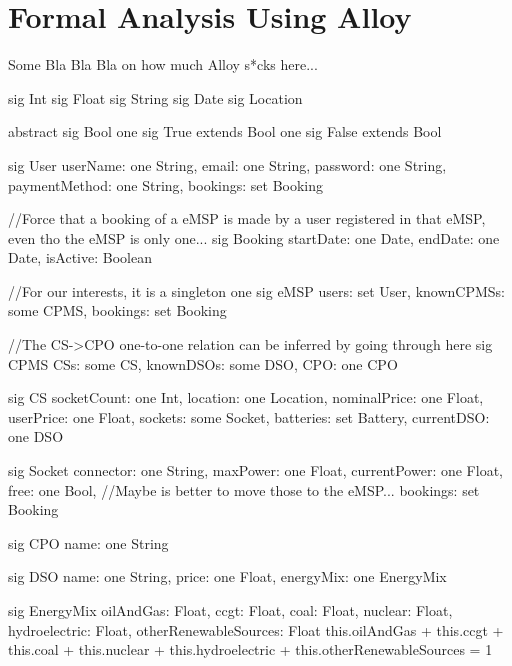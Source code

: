 \documentclass[11pt]{article}
\def\code#1{{\texttt{#1}}}
\begin{document}
\section{Formal Analysis Using Alloy}
\label{section:alloy}

Some Bla Bla Bla on how much Alloy s*cks here...


\begin{ffcode}
    sig Int {}
    sig Float {}
    sig String {}
    sig Date {}
    sig Location {}
    
    abstract sig Bool {}
    one sig True extends Bool {}
    one sig False extends Bool {}
    
    sig User {
        userName: one String,
        email: one String,
        password: one String,
        paymentMethod: one String,
        bookings: set Booking
    }
    
    //Force that a booking of a eMSP is made by a user registered in that eMSP, even tho the eMSP is only one...
    sig Booking {
        startDate: one Date,
        endDate: one Date,
        isActive: Boolean
    }
    
    //For our interests, it is a singleton
    one sig eMSP {
        users: set User,
        knownCPMSs: some CPMS,
        bookings: set Booking
    }
    
    //The CS->CPO one-to-one relation can be inferred by going through here
    sig CPMS {
        CSs: some CS,
        knownDSOs: some DSO,
        CPO: one CPO
    }
    
    sig CS {
        socketCount: one Int,
        location: one Location,
        nominalPrice: one Float,
        userPrice: one Float,
        sockets: some Socket,
        batteries: set Battery,
        currentDSO: one DSO
    }
    
    sig Socket {
        connector: one String,
        maxPower: one Float,
        currentPower: one Float,
        free: one Bool,
        //Maybe is better to move those to the eMSP...
        bookings: set Booking
    }
    
    sig CPO {
        name: one String
    }
    
    sig DSO {
        name: one String,
        price: one Float,
        energyMix: one EnergyMix
    }
    
    sig EnergyMix {
        oilAndGas: Float,
        ccgt: Float,
        coal: Float,
        nuclear: Float,
        hydroelectric: Float,
        otherRenewableSources: Float
    } {
        this.oilAndGas + this.ccgt + this.coal + this.nuclear + this.hydroelectric + this.otherRenewableSources = 1
    }
    
\end{ffcode}
\end{document}
